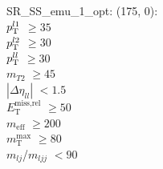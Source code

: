SR\_SS\_emu\_1\_opt: (175, 0): \\
$p_{\text{T}}^{l1}$ $\geq 35$ \\
$p_{\text{T}}^{l2}$ $\geq 30$ \\
$p_{\text{T}}^{ll}$ $\geq 30$ \\
$m_{T2}$ $\geq 45$ \\
$|\Delta\eta_{ll}|$ $<1.5$ \\
$E_{\text{T}}^{\text{miss,rel}}$ $\geq 50$ \\
$m_{\text{eff}}$ $\geq 200$ \\
$m_{\text{T}}^{\text{max}}$ $\geq 80$ \\
$m_{lj}$/$m_{ljj}$ $<90$ \\
